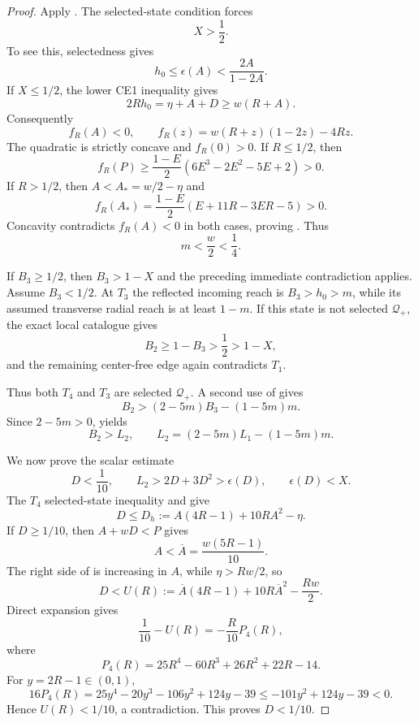 \begin{proof}
Apply . The selected-state condition forces
\begin{equation}
 \boxed{X>\frac12.}
 \label{eq:ce1-X-half}
\end{equation}
To see this, selectedness gives
\[
 h_0\le\epsilon(A)<\frac{2A}{1-2A}.
\]
If $X\le1/2$, the lower CE1 inequality gives
\[
 2Rh_0=\eta+A+D\ge w(R+A).
\]
Consequently
\[
 f_R(A)<0,
 \qquad
 f_R(z)=w(R+z)(1-2z)-4Rz.
\]
The quadratic is strictly concave and $f_R(0)>0$.  If $R\le1/2$, then
\[
 f_R(P)\ge\frac{1-E}{2}
 (6E^3-2E^2-5E+2)>0.
\]
If $R>1/2$, then $A<A_*=w/2-\eta$ and
\[
 f_R(A_*)=\frac{1-E}{2}(E+11R-3ER-5)>0.
\]
Concavity contradicts $f_R(A)<0$ in both cases, proving
.  Thus
\begin{equation}
 m<\frac w2<\frac14.
 \label{eq:ce1-m-quarter}
\end{equation}

If $B_3\ge1/2$, then $B_3>1-X$ and the preceding immediate contradiction
applies.  Assume $B_3<1/2$.  At $T_3$ the reflected incoming reach is
$B_3>h_0>m$, while its assumed transverse radial reach is at least $1-m$.
If this state is not selected $\mathcal Q_+$, the exact local catalogue gives
\[
 B_2\ge1-B_3>\frac12>1-X,
\]
and the remaining center-free edge again contradicts $T_1$.

Thus both $T_4$ and $T_3$ are selected $\mathcal Q_+$.  A second use of
 gives
\[
 B_2>(2-5m)B_3-(1-5m)m.
\]
Since $2-5m>0$,  yields
\begin{equation}
 \boxed{
 B_2>L_2,
 \qquad
 L_2=(2-5m)L_1-(1-5m)m.
 }
 \label{eq:ce1-second-chord}
\end{equation}



We now prove the scalar estimate
\begin{equation}
 \boxed{
 D<\frac1{10},
 \qquad
 L_2>2D+3D^2>\epsilon(D),
 \qquad
 \epsilon(D)<X.
 }
 \label{eq:ce1-scalar-estimate}
\end{equation}
The $T_4$ selected-state inequality and
 give
\begin{equation}
 D\le D_h:=A(4R-1)+10RA^2-\eta.
 \label{eq:ce1-Dh}
\end{equation}
If $D\ge1/10$, then $A+wD<P$ gives
\[
 A<\overline A=\frac{w(5R-1)}{10}.
\]
The right side of  is increasing in $A$, while
$\eta>Rw/2$, so
\[
 D<U(R):=\overline A(4R-1)+10R\overline A^2-\frac{Rw}{2}.
\]
Direct expansion gives
\[
 \frac1{10}-U(R)=-\frac R{10}P_4(R),
\]
where
\[
 P_4(R)=25R^4-60R^3+26R^2+22R-14.
\]
For $y=2R-1\in(0,1)$,
\[
 16P_4(R)
 =25y^4-20y^3-106y^2+124y-39
 \le-101y^2+124y-39<0.
\]
Hence $U(R)<1/10$, a contradiction.  This proves $D<1/10$.


\end{proof}
